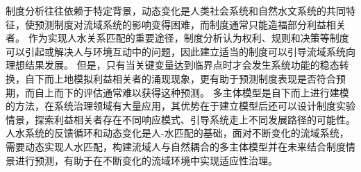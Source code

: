 制度分析往往依赖于特定背景，动态变化是人类社会系统和自然水文系统的共同特征，使预测制度对流域系统的影响变得困难，而制度通常只能造福部分利益相关者\cite{epstein2015}。
作为实现人\textendash{}水关系匹配的重要途径，制度分析认为权利、规则和决策等制度可以引起或解决人与环境互动中的问题，因此建立适当的制度可以引导流域系统向理想结果发展\cite{wang2019c}。
但是，只有当关键变量达到临界点时才会发生系统功能的稳态转换，自下而上地模拟利益相关者的涌现现象，更有助于预测制度表现是否符合预期，而自上而下的评估通常难以获得这种预测\cite{reyers2018}。
多主体模型是自下而上进行建模的方法，在系统治理领域有大量应用，其优势在于建立模型后还可以设计制度实验情景，探索利益相关者存在不同响应模式、引导系统走上不同发展路径的可能性。
人\textendash{}水系统的反馈循环和动态变化是人-水匹配的基础，面对不断变化的流域系统，需要动态实现人水匹配，构建流域人与自然耦合的多主体模型并在未来结合制度情景进行预测，有助于在不断变化的流域环境中实现适应性治理。
